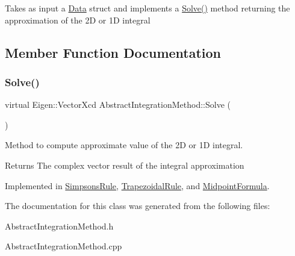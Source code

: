 Takes as input a \hyperlink{struct_data}{Data} struct and implements a \hyperlink{class_abstract_integration_method_af76e5bdce7d0b139d07e920fa29c1c34}{Solve()} method returning the approximation of the 2D or 1D integral 

\subsection{Member Function Documentation}
\mbox{\label{class_abstract_integration_method_af76e5bdce7d0b139d07e920fa29c1c34}} 
\subsubsection{\texorpdfstring{Solve()}{Solve()}}
{\footnotesize\ttfamily virtual Eigen\+::\+Vector\+Xcd Abstract\+Integration\+Method\+::\+Solve (\begin{DoxyParamCaption}{ }\end{DoxyParamCaption})\hspace{0.3cm}{\ttfamily [pure virtual]}}



Method to compute approximate value of the 2D or 1D integral. 

\begin{DoxyReturn}{Returns}
The complex vector result of the integral approximation 
\end{DoxyReturn}


Implemented in \hyperlink{class_simpsons_rule_a9925b07e44be9fc1644d3cbeb742078c}{Simpsons\+Rule}, \hyperlink{class_trapezoidal_rule_ae822d86948bdc8876bf524cd620e11b8}{Trapezoidal\+Rule}, and \hyperlink{class_midpoint_formula_add437323dfb0bc181b0051c5aaf80ba7}{Midpoint\+Formula}.



The documentation for this class was generated from the following files\+:\begin{DoxyCompactItemize}
\item 
Abstract\+Integration\+Method.\+h\item 
Abstract\+Integration\+Method.\+cpp\end{DoxyCompactItemize}
